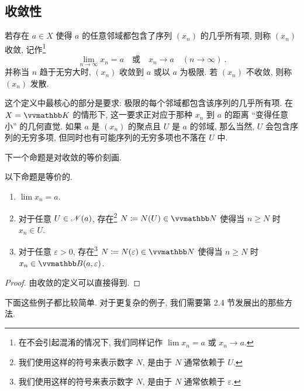 \subsection{收敛性}

\begin{definition}[收敛]
    若存在 \(a \in X\) 使得 \(a\) 的任意邻域都包含了序列 \((x_n)\) 的几乎所有项, 则称 \((x_n)\) 收敛, 记作\footnote{在不会引起混淆的情况下, 我们同样记作 \(\lim x_n = a\) 或 \(x_n \to a\).}
    \[
        \lim_{n \to \infty} x_n = a\quad \text{或}\quad x_n \to a\quad (n \to \infty)\ .
    \]
    并称当 \(n\) 趋于无穷大时, \((x_n)\) 收敛到 \(a\) 或以 \(a\) 为极限. 若 \((x_n)\) 不收敛, 则称 \((x_n)\) 发散.
\end{definition}

这个定义中最核心的部分是要求: 极限的每个邻域都包含该序列的几乎所有项. 在 \(X = \K\) 的情形下, 这一要求正对应于那种 \(x_n\) 到 \(a\) 的距离 ``变得任意小'' 的几何直觉. 如果 \(a\) 是 \((x_n)\) 的聚点且 \(U\) 是 \(a\) 的邻域, 那么当然, \(U\) 会包含序列的无穷多项, 但同时也有可能序列的无穷多项也不落在 \(U\) 中.

下一个命题是对收敛的等价刻画.

\begin{proposition}\label{prop:convergent-sequence-charact}
    以下命题是等价的.
    \begin{enumerate}
        \item \(\lim x_n = a\).
        \item 对于任意 \(U \in \mathscr N(a)\), 存在\footnote{我们使用这样的符号来表示数字 \(N\), 是由于 \(N\) 通常依赖于 \(U\).} \(N \coloneqq N(U) \in \N\) 使得当 \(n \geq N\) 时 \(x_n \in U\).
        \item 对于任意 \(\varepsilon > 0\), 存在\footnote{我们使用这样的符号来表示数字 \(N\), 是由于 \(N\) 通常依赖于 \(\varepsilon\).} \(N \coloneqq N(\varepsilon) \in \N\) 使得当 \(n \geq N\) 时 \(x_n \in \B(a, \varepsilon)\).
    \end{enumerate}
\end{proposition}

\begin{proof}
    由收敛的定义可以直接得到.
\end{proof}

下面这些例子都比较简单. 对于更复杂的例子, 我们需要第 2.4 节发展出的那些方法.

